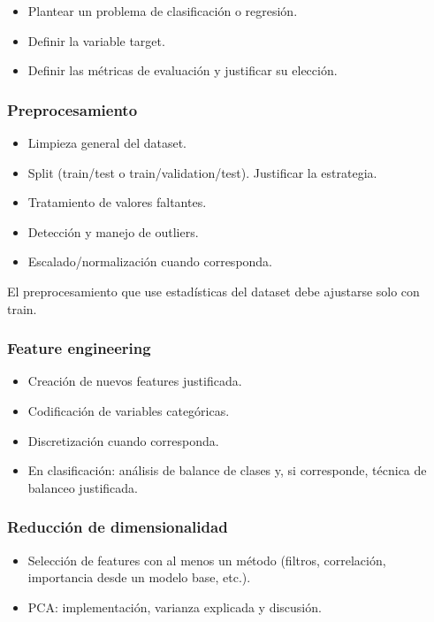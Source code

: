 \documentclass[12pt]{article}
\begin{document}
\begin{itemize}
    \item Plantear un problema de clasificación o regresión.
    \item Definir la variable target.
    \item Definir las métricas de evaluación y justificar su elección.
\end{itemize}

\subsubsection{Preprocesamiento}

\begin{itemize}
    \item Limpieza general del dataset.
    \item Split (train/test o train/validation/test). Justificar la estrategia.
    \item Tratamiento de valores faltantes.
    \item Detección y manejo de outliers.
    \item Escalado/normalización cuando corresponda.
\end{itemize}

El preprocesamiento que use estadísticas del dataset debe ajustarse solo con train.

\subsubsection{Feature engineering}

\begin{itemize}
    \item Creación de nuevos features justificada.
    \item Codificación de variables categóricas.
    \item Discretización cuando corresponda.
    \item En clasificación: análisis de balance de clases y, si corresponde, técnica de balanceo justificada.
\end{itemize}

\subsubsection{Reducción de dimensionalidad}

\begin{itemize}
    \item Selección de features con al menos un método (filtros, correlación, importancia desde un modelo base, etc.).
    \item PCA: implementación, varianza explicada y discusión.
\end{itemize}
\end{document}
